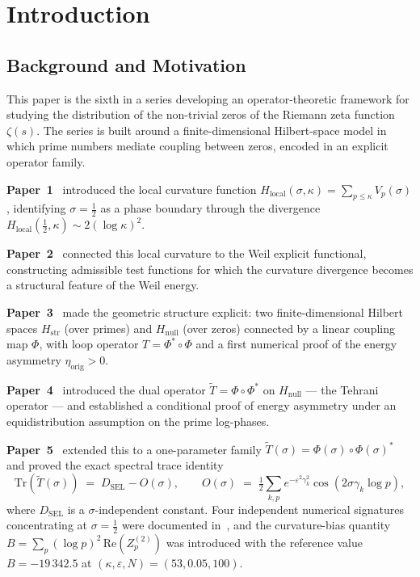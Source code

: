 \documentclass[11pt]{article}
\newcommand{\Hstr}{H_{\mathrm{str}}}
\newcommand{\Hnull}{H_{\mathrm{null}}}
\newcommand{\etaorig}{\eta_{\mathrm{orig}}}
\newcommand{\Tt}{\widetilde{T}}
\newcommand{\Hlocal}{H_{\mathrm{local}}}
\newcommand{\DSEL}{D_{\mathrm{SEL}}}
\begin{document}
\newpage

\section{Introduction}
\label{sec:intro}

\subsection{Background and Motivation}

This paper is the sixth in a series developing an operator-theoretic
framework for studying the distribution of the non-trivial zeros of
the Riemann zeta function $\zeta(s)$.
The series is built around a finite-dimensional Hilbert-space model in
which prime numbers mediate coupling between zeros, encoded in an
explicit operator family.

\textbf{Paper~1}~\cite{Paper1} introduced the local curvature function
$\Hlocal(\sigma,\kappa)=\sum_{p\le\kappa}V_p(\sigma)$, identifying
$\sigma=\tfrac12$ as a phase boundary through the divergence
$\Hlocal(\tfrac12,\kappa)\sim 2(\log\kappa)^2$.

\textbf{Paper~2}~\cite{Paper2} connected this local curvature to the
Weil explicit functional, constructing admissible test functions
for which the curvature divergence becomes a structural feature of
the Weil energy.

\textbf{Paper~3}~\cite{Paper3} made the geometric structure explicit:
two finite-dimensional Hilbert spaces $\Hstr$ (over primes) and
$\Hnull$ (over zeros) connected by a linear coupling map $\Phi$, with
loop operator $T=\Phi^*\circ\Phi$ and a first numerical proof of the
energy asymmetry $\etaorig>0$.

\textbf{Paper~4}~\cite{Paper4} introduced the dual operator
$\Tt=\Phi\circ\Phi^*$ on $\Hnull$ --- the Tehrani operator --- and
established a conditional proof of energy asymmetry under an
equidistribution assumption on the prime log-phases.

\textbf{Paper~5}~\cite{Paper5} extended this to a one-parameter
family $\Tt(\sigma)=\Phi(\sigma)\circ\Phi(\sigma)^*$ and proved the
exact spectral trace identity
\[
\mathrm{Tr}(\Tt(\sigma)) \;=\; \DSEL - O(\sigma),
\qquad
O(\sigma) \;=\; \tfrac12\sum_{k,p} e^{-\varepsilon^2\gamma_k^2}
                \cos(2\sigma\gamma_k\log p),
\]
where $\DSEL$ is a $\sigma$-independent constant.
Four independent numerical signatures concentrating at $\sigma=\tfrac12$
were documented in~\cite{Paper4,Paper5}, and the curvature-bias quantity
$B=\sum_p(\log p)^2\,\mathrm{Re}(Z_p^{(2)})$ was introduced with the reference
value $B=-19\,342.5$ at $(\kappa,\varepsilon,N)=(53,0.05,100)$.
\end{document}
